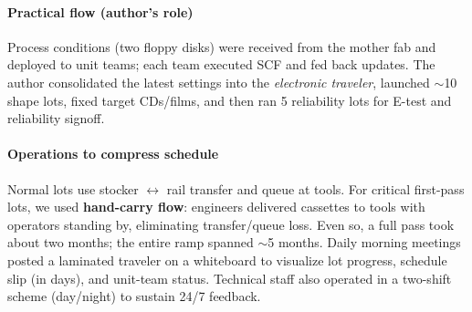 \paragraph{Practical flow (author's role)}
Process conditions (two floppy disks) were received from the mother fab and deployed to unit teams; each team executed SCF and fed back updates. The author consolidated the latest settings into the \emph{electronic traveler}, launched $\sim$10 shape lots, fixed target CDs/films, and then ran 5 reliability lots for E-test and reliability signoff.

\paragraph{Operations to compress schedule}
Normal lots use stocker $\leftrightarrow$ rail transfer and queue at tools. For critical first-pass lots, we used \textbf{hand-carry flow}: engineers delivered cassettes to tools with operators standing by, eliminating transfer/queue loss. Even so, a full pass took about two months; the entire ramp spanned $\sim$5 months. Daily morning meetings posted a laminated traveler on a whiteboard to visualize lot progress, schedule slip (in days), and unit-team status. Technical staff also operated in a two-shift scheme (day/night) to sustain 24/7 feedback.
